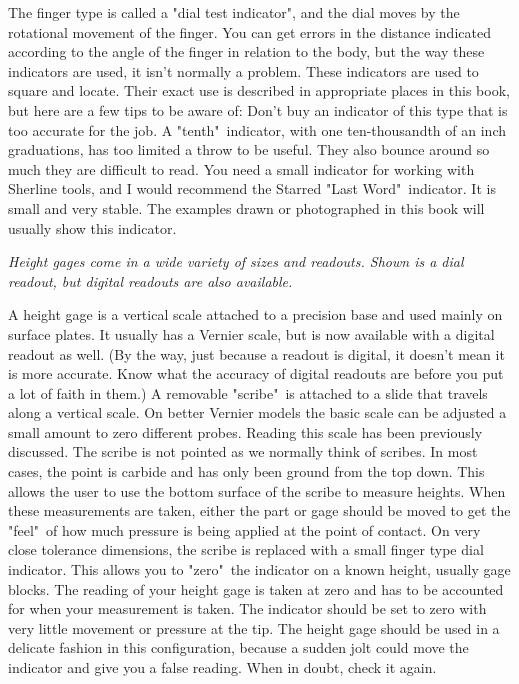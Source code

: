 The finger type is called a "dial test indicator", and the dial moves by the
rotational movement of the finger. You can get errors in the distance indicated
according to the angle of the finger in relation to the body, but the way these
indicators are used, it isn't normally a problem. These indicators are used to
square and locate. Their exact use is described in appropriate places in this
book, but here are a few tips to be aware of: Don't buy an indicator of this
type that is too accurate for the job. A "tenth"\ indicator, with one
ten-thousandth of an inch graduations, has too limited a throw to be useful.
They also bounce around so much they are difficult to read. You need a small
indicator for working with Sherline tools, and I would recommend the Starred
"Last Word"\ indicator. It is small and very stable. The examples drawn or
photographed in this book will usually show this indicator.

\bigskip
\textit{Height gages come in a wide variety of  sizes and readouts. Shown is a
dial readout, but digital readouts are also available.}
\bigskip


A height gage is a vertical scale attached to a precision base and used mainly
on surface plates. It usually has a Vernier scale, but is now available with a
digital readout as well. (By the way, just because a readout is digital, it
doesn't mean it is more accurate. Know what the accuracy of digital readouts are
before you put a lot of faith in them.) A removable "scribe"\ is attached to a
slide that travels along a vertical scale. On better Vernier models the basic
scale can be adjusted a small amount to zero different probes. Reading this
scale has been previously discussed. The scribe is not pointed as we normally
think of scribes. In most cases, the point is carbide and has only been ground
from the top down. This allows the user to use the bottom surface of the scribe
to measure heights. When these measurements are taken, either the part or gage
should be moved to get the "feel"\ of how much pressure is being applied at the
point of contact. On very close tolerance dimensions, the scribe is replaced
with a small finger type dial indicator. This allows you to "zero"\ the indicator
on a known height, usually gage blocks. The reading of your height gage is taken
at zero and has to be accounted for when your measurement is taken. The
indicator should be set to zero with very little movement or pressure at the
tip. The height gage should be used in a delicate fashion in this configuration,
because a sudden jolt could move the indicator and give you a false reading.
When in doubt, check it again.

